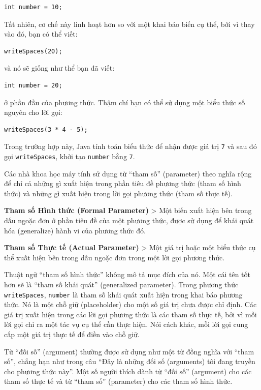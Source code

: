\begin{verbatim}
int number = 10;
\end{verbatim}

Tất nhiên, cơ chế này linh hoạt hơn so với một khai báo biến cụ thể, bởi
vì thay vào đó, bạn có thể viết:

\begin{verbatim}
writeSpaces(20);
\end{verbatim}

và nó sẽ giống như thể bạn đã viết:

\begin{verbatim}
int number = 20;
\end{verbatim}

ở phần đầu của phương thức. Thậm chí bạn có thể sử dụng một biểu thức số
nguyên cho lời gọi:

\begin{verbatim}
writeSpaces(3 * 4 - 5);
\end{verbatim}

Trong trường hợp này, Java tính toán biểu thức để nhận được giá trị
\texttt{7} và sau đó gọi \texttt{writeSpaces}, khởi tạo \texttt{number}
bằng \texttt{7}.

Các nhà khoa học máy tính sử dụng từ ``tham số'' (parameter) theo nghĩa
rộng để chỉ cả những gì xuất hiện trong phần tiêu đề phương thức (tham
số hình thức) và những gì xuất hiện trong lời gọi phương thức (tham số
thực tế).

\textbf{Tham số Hình thức (Formal Parameter)} \textgreater{} Một biến
xuất hiện bên trong dấu ngoặc đơn ở phần tiêu đề của một phương thức,
được sử dụng để khái quát hóa (generalize) hành vi của phương thức đó.

\textbf{Tham số Thực tế (Actual Parameter)} \textgreater{} Một giá trị
hoặc một biểu thức cụ thể xuất hiện bên trong dấu ngoặc đơn trong một
lời gọi phương thức.

Thuật ngữ ``tham số hình thức'' không mô tả mục đích của nó. Một cái tên
tốt hơn sẽ là ``tham số khái quát'' (generalized parameter). Trong
phương thức \texttt{writeSpaces}, \texttt{number} là tham số khái quát
xuất hiện trong khai báo phương thức. Nó là một chỗ giữ (placeholder)
cho một số giá trị chưa được chỉ định. Các giá trị xuất hiện trong các
lời gọi phương thức là các tham số thực tế, bởi vì mỗi lời gọi chỉ ra
một tác vụ cụ thể cần thực hiện. Nói cách khác, mỗi lời gọi cung cấp một
giá trị thực tế để điền vào chỗ giữ.

Từ ``đối số'' (argument) thường được sử dụng như một từ đồng nghĩa với
``tham số'', chẳng hạn như trong câu ``Đây là những đối số (arguments)
tôi đang truyền cho phương thức này''. Một số người thích dành từ ``đối
số'' (argument) cho các tham số thực tế và từ ``tham số'' (parameter)
cho các tham số hình thức.

